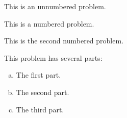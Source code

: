 \documentclass[11pt,letterpaper]{article}
\begin{document}


\prob This is an unnumbered problem. \pspace


\problem This is a numbered problem. \vspace{1.5cm}


\problem This is the second numbered problem. \vfill


\problem This problem has several parts:
	\begin{enumerate}[(a)]
	\item The first part.
	\item The second part. 
	\item The third part. 
	\end{enumerate} \vspace{6cm}
\end{document}
